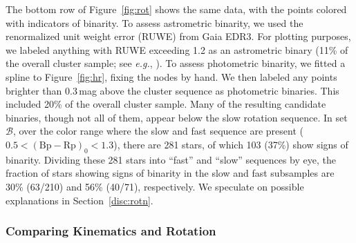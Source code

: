 \documentclass[12pt,twocolumn,tighten]{aastex63}
\newcommand{\bpmrp}{(\mathrm{Bp}-\mathrm{Rp})_0}
\begin{document}
The bottom row of Figure~\ref{fig:rot} shows the same data, with the
points colored with indicators of binarity.  To assess astrometric
binarity, we used the renormalized unit weight error (RUWE) from Gaia
EDR3.  For plotting purposes, we labeled anything with RUWE exceeding
1.2 as an astrometric binary (11\% of the overall cluster sample; see
{\it e.g.}, \citealt{belokurov_unresolved_2020}).  To assess
photometric binarity, we fitted a spline to Figure~\ref{fig:hr},
fixing the nodes by hand.  We then labeled any points brighter than
0.3\,mag above the cluster sequence as photometric binaries.  This
included 20\% of the overall cluster sample.  Many of the resulting
candidate binaries, though not all of them, appear below the slow
rotation sequence.  In set $\mathcal{B}$, over the color range where
the slow and fast sequence are present ($0.5<\bpmrp<1.3$), there are
281 stars, of which 103 (37\%) show signs of binarity.  Dividing these
281 stars into ``fast'' and ``slow'' sequences by eye,  the fraction
of stars showing signs of binarity in the slow and fast subsamples are
30\% (63/210) and 56\% (40/71), respectively.  We speculate on
possible explanations in Section~\ref{disc:rotn}.


\subsubsection{Comparing Kinematics and Rotation}
\end{document}
